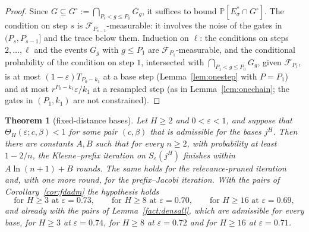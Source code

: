 \documentclass[11pt]{amsart}
\newtheorem{theorem}{Theorem}
\theoremstyle{definition}
\theoremstyle{remark}
\newcommand{\eps}{\varepsilon}
\newcommand{\PP}{\mathbb{P}}
\newcommand{\cF}{\mathcal{F}}
\begin{document}
\begin{proof}
Since $G\subseteq G^\circ:=\bigcap_{P_\ell<g\le P_0}G_g$, it suffices to bound
$\PP[E^*_\sigma\cap G^\circ]$. The condition on step $s$ is $\cF_{P_{s-1}}$-measurable: it involves
the noise of the gates in $(P_s,P_{s-1}]$ and the trace below them. Induction on $\ell$: the
conditions on steps $2,\dots,\ell$ and the events
$G_g$ with $g\le P_1$ are $\cF_{P_1}$-measurable, and the conditional probability of the condition
on step $1$, intersected with $\bigcap_{P_1<g\le P_0}G_g$, given $\cF_{P_1}$, is at most
$(1-\eps)T_{P_0-k_1}$ at a base step (Lemma~\ref{lem:onestep} with $P=P_1$) and at most
$r^{P_0-k_1}\eps/k_1$ at a resampled step (as in Lemma~\ref{lem:onechain}; the gates in $(P_1,k_1)$
are not constrained).
\end{proof}

\begin{theorem}[fixed-distance bases]\label{thm:fixed}
Let $H\ge2$ and $0<\eps<1$, and suppose that $\Theta_H(\eps;c,\beta)<1$ for some pair $(c,\beta)$
that is admissible for the bases $j^H$. Then there are constants $A,B$ such that for every $n\ge2$, with probability at
least $1-2/n$, the Kleene--prefix iteration on $S_\eps(j^H)$ finishes within $A\ln(n+1)+B$ rounds.
The same holds for the relevance-pruned iteration and, with one more round, for the
prefix--Jacobi iteration. With the pairs of Corollary~\ref{cor:fdadm} the hypothesis holds
\[
\text{for }H\ge3\text{ at }\eps=0.73,\qquad\text{for }H\ge8\text{ at }\eps=0.70,\qquad
\text{for }H\ge16\text{ at }\eps=0.69 ,
\]
and already with the pairs of Lemma~\ref{fact:densall}, which are admissible for every base, for
$H\ge3$ at $\eps=0.74$, for $H\ge8$ at $\eps=0.72$ and for $H\ge16$ at $\eps=0.71$.
\end{theorem}
\end{document}
